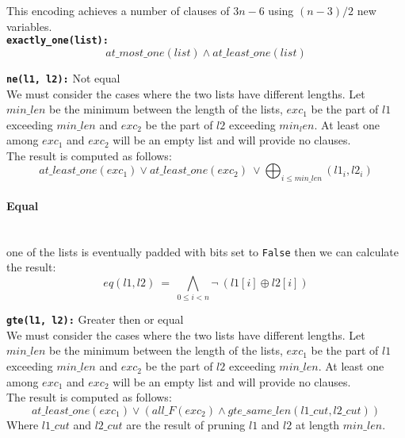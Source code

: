   This encoding achieves a number of clauses of $3n - 6$ using $(n-3)/2$ new variables. \\

  \texttt{\textbf{exactly\_one(list):}}
  \begin{equation}
      at\_most\_one(list) \wedge at\_least\_one(list)
  \end{equation}


  \texttt{\textbf{ne(l1, l2):}} Not equal\\
  We must consider the cases where the two lists have different lengths.
  Let $min\_len$ be the minimum between the length of the lists, $exc_1$ be the part of $l1$
  exceeding $min\_len$ and $exc_2$ be the part of $l2$ exceeding $min_len$. At least one 
  among $exc_1$ and $exc_2$ will be an empty list and will provide no clauses.\\
  The result is computed as follows:
  \begin{equation}
      at\_least\_one(exc_1) \lor at\_least\_one(exc_2)\ \lor \bigoplus_{i \leq min\_len}(l1_i, l2_i)
  \end{equation}

  \paragraph*{Equal} \hfill \\
    one of the lists is eventually padded with bits set to \texttt{False} then we can
    calculate the result:
    \begin{equation}
      eq(l1, l2)\ =\ \bigwedge\limits_{0 \leq i < n} \neg\ (l1[i] \oplus l2[i])
    \end{equation}


  \texttt{\textbf{gte(l1, l2):}} Greater then or equal\\
  We must consider the cases where the two lists have different lengths.
  Let $min\_len$ be the minimum between the length of the lists, $exc_1$ be the part of $l1$ 
  exceeding $min\_len$ and $exc_2$ be the part of $l2$ exceeding $min\_len$. At least one among
  $exc_1$ and $exc_2$ will be an empty list and will provide no clauses.\\
  The result is computed as follows:
  \begin{equation}
      at\_least\_one(exc_1) \vee ( all\_F(exc_2) \wedge gte\_same\_len(l1\_cut, l2\_cut))
  \end{equation}
  Where $l1\_cut$ and $l2\_cut$ are the result of pruning $l1$ and $l2$ at length $min\_len$.\\

